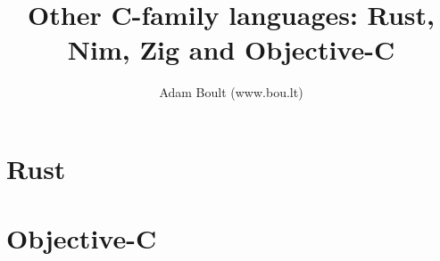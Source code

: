 \documentclass[oneside]{book}
\begin{document}
\author{Adam Boult (www.bou.lt)}
\title{Other C-family languages: Rust, Nim, Zig and Objective-C}
\maketitle

\setcounter{tocdepth}{0}
\tableofcontents



\part{Rust}







\part{Objective-C}
\end{document}
